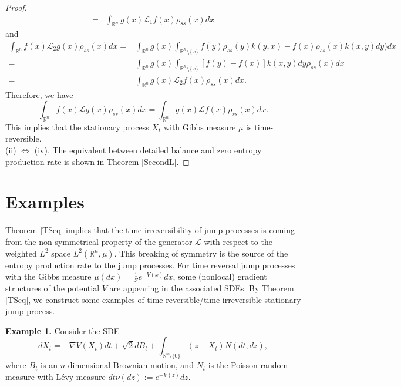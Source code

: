\documentclass[10pt]{article}
\theoremstyle{definition}
\theoremstyle{remark}
\numberwithin{equation}{section}
\begin{document}
\begin{proof}
\begin{align*}
     = & \int_{\mathbb{R}^n} g(x) \mathcal{L}_{1}f(x) \rho_{ss}(x)dx
\end{align*}
and
\begin{align*}
    \int_{\mathbb{R}^n} f(x) \mathcal{L}_{2}g(x) \rho_{ss}(x)dx = & \int_{\mathbb{R}^n} g(x) \int_{\mathbb{R}^{n}\setminus \{x\}}f(y) \rho_{ss}(y) k(y,x) - f(x) \rho_{ss}(x) k(x,y)dy)dx \\
    = &  \int_{\mathbb{R}^n} g(x) \int_{\mathbb{R}^{n}\setminus \{x\}} [f(y) - f(x)] k(x,y)dy\rho_{ss}(x) dx  \\
     = & \int_{\mathbb{R}^n} g(x) \mathcal{L}_{2}f(x) \rho_{ss}(x)dx.
\end{align*}
Therefore, we have
\begin{equation*}
    \int_{\mathbb{R}^n} f(x) \mathcal{L}g(x) \rho_{ss}(x)dx = \int_{\mathbb{R}^n} g(x) \mathcal{L} f(x) \rho_{ss}(x)dx.
\end{equation*}
This implies that the stationary process $X_t$ with Gibbs measure $\mu$ is time-reversible.\\
(ii) $\Leftrightarrow$ (iv). The equivalent between detailed balance and zero entropy production rate is shown in Theorem \ref{SecondL}.
\end{proof}


\section{Examples}\label{Sec6}

Theorem \ref{TSeq} implies that the time irreversibility of jump processes is coming from the non-symmetrical property of the generator $\mathcal{L}$ with respect to the weighted $L^2$ space $L^2(\mathbb{R}^n,\mu)$. This breaking of symmetry is the source of the entropy production rate to the jump processes. For time reversal jump processes with the Gibbs measure $\mu(dx) = \frac{1}{Z}e^{-V(x)}dx$, some (nonlocal) gradient structures of the potential $V$ are appearing in the associated SDEs.
By Theorem \ref{TSeq}, we construct some examples of time-reversible/time-irreversible stationary jump process.

\noindent\textbf{Example 1.} Consider the SDE
\begin{equation}\label{EX1SDE}
    dX_t = -\nabla V(X_t) dt +\sqrt{2} dB_t + \int_{\mathbb{R}^n\setminus \{0\}} (z-X_t)N(dt,dz),
\end{equation}
where $B_t$ is an $n$-dimensional Brownian motion, and $N_t$ is the Poisson random measure with L\'{e}vy measure $dt\nu(dz):= e^{-V(z)}dz$.
\end{document}
